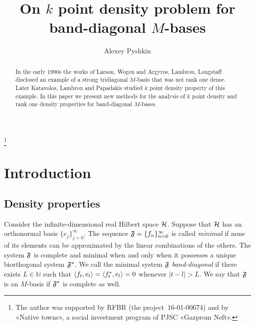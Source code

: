 \documentclass[12pt]{amsart}
\theoremstyle{case}
\begin{document}
\title{On $k$ point density problem for band-diagonal $M$-bases}
\author{Alexey Pyshkin}
\begin{abstract}
  In the early 1990s the works of Larson, Wogen and Argyros, Lambrou, Longstaff
    disclosed an example of a strong tridiagonal $M$-basis that was not rank one dense.
  Later Katavolos, Lambrou and Papadakis studied $k$ point density property of this example.
  In this paper we present new methods for the analysis of $k$ point density
    and rank one density properties for band-diagonal $M$-bases.
\end{abstract}
\thanks{The author was supported by RFBR (the project~16-01-00674) and by «Native towns», a social investment program of PJSC «Gazprom Neft».}
\maketitle

\section{Introduction}
  \subsection{Density properties}
    Consider the infinite-dimensional real Hilbert space $\cal{H}$.
    Suppose that $\cal{H}$ has an orthonormal basis $\{e_j\}_{j=0}^\infty$.
    The sequence $\fsys=\seq{f}$ is called \emph{minimal} if none of its elements can be approximated by the linear combinations of the others.
    The system $\fsys$ is complete and minimal when and only when it possesses a unique biorthogonal system $\fstarsys$.
    We call the minimal system $\fsys$ \emph{band-diagonal} if there exists $L \in \mathbb{N}$ such that $\inner{f_t}{e_l} = \inner{f^*_t}{e_l} = 0$
      whenever $\lvert t - l \rvert > L$.
    We say that $\fsys$ is an $M$-basis if $\fstarsys$ is complete as well.
    
\end{document}

